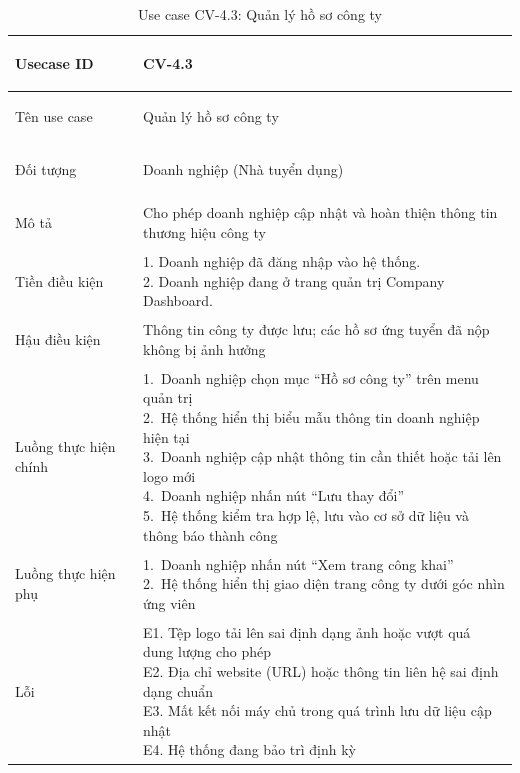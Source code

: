 \begin{table}[H]
    \centering
    \small
    \renewcommand{\arraystretch}{0.90}
    \begin{tabularx}{\textwidth}{|
        >{\bfseries\raggedright\arraybackslash}p{2.6cm}|Y|}
        \hline

        Usecase ID & CV-4.3 \\ \hline

        Tên use case & Quản lý hồ sơ công ty \\ \hline

        Đối tượng & Doanh nghiệp (Nhà tuyển dụng) \\ \hline

        Mô tả & Cho phép doanh nghiệp cập nhật và hoàn thiện thông tin thương hiệu công ty \\ \hline

        Tiền điều kiện &
        \parbox[t]{\hsize}{
            1. Doanh nghiệp đã đăng nhập vào hệ thống.\\
            2. Doanh nghiệp đang ở trang quản trị Company Dashboard.
        } \\
        \hline

        Hậu điều kiện & Thông tin công ty được lưu; các hồ sơ ứng tuyển đã nộp không bị ảnh hưởng \\ \hline

        Luồng thực hiện chính &
        \parbox[t]{\hsize}{
            1.\ Doanh nghiệp chọn mục ``Hồ sơ công ty'' trên menu quản trị\\
            2.\ Hệ thống hiển thị biểu mẫu thông tin doanh nghiệp hiện tại\\
            3.\ Doanh nghiệp cập nhật thông tin cần thiết hoặc tải lên logo mới\\
            4.\ Doanh nghiệp nhấn nút ``Lưu thay đổi''\\
            5.\ Hệ thống kiểm tra hợp lệ, lưu vào cơ sở dữ liệu và thông báo thành công
        }\\
        \hline

        Luồng thực hiện phụ &
        \parbox[t]{\hsize}{
            1.\ Doanh nghiệp nhấn nút ``Xem trang công khai''\\
            2.\ Hệ thống hiển thị giao diện trang công ty dưới góc nhìn ứng viên
        }\\
        \hline

        Lỗi &
        \parbox[t]{\hsize}{
            E1. Tệp logo tải lên sai định dạng ảnh hoặc vượt quá dung lượng cho phép\\
            E2. Địa chỉ website (URL) hoặc thông tin liên hệ sai định dạng chuẩn\\
            E3. Mất kết nối máy chủ trong quá trình lưu dữ liệu cập nhật\\
            E4. Hệ thống đang bảo trì định kỳ
        }\\
        \hline

    \end{tabularx}

    \caption{Use case CV-4.3: Quản lý hồ sơ công ty}
    \label{tab:usecase-cv43}
\end{table}


